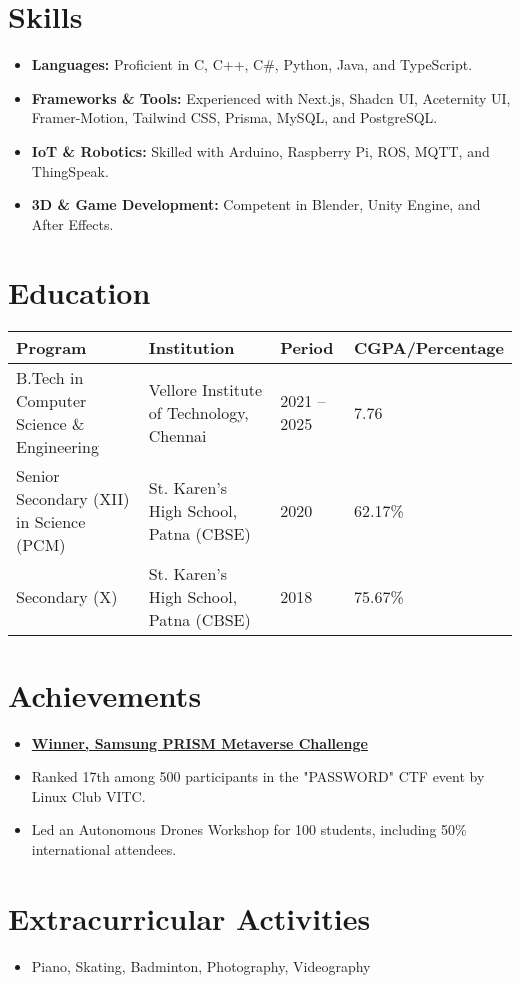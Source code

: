 \documentclass[a4paper,10pt]{article}
\newcommand{\sectionbreak}{\vspace{0.2em}}
\begin{document}
\section{Skills}
\begin{itemize}[noitemsep, topsep=0pt]
    \item \textbf{Languages:} Proficient in C, C++, C\#, Python, Java, and TypeScript.
    \item \textbf{Frameworks \& Tools:} Experienced with Next.js, Shadcn UI, Aceternity UI, Framer-Motion, Tailwind CSS, Prisma, MySQL, and PostgreSQL.
    \item \textbf{IoT \& Robotics:} Skilled with Arduino, Raspberry Pi, ROS, MQTT, and ThingSpeak.
    \item \textbf{3D \& Game Development:} Competent in Blender, Unity Engine, and After Effects.
\end{itemize}

\sectionbreak

\section{Education}
\begin{tabular}{|l|l|l|l|}
\hline
\textbf{Program} & \textbf{Institution} & \textbf{Period} & \textbf{CGPA/Percentage} \\ \hline
B.Tech in Computer Science \& Engineering & Vellore Institute of Technology, Chennai & 2021 – 2025 & 7.76 \\ \hline
Senior Secondary (XII) in Science (PCM) & St. Karen's High School, Patna (CBSE) & 2020 & 62.17\% \\ \hline
Secondary (X) & St. Karen's High School, Patna (CBSE) & 2018 & 75.67\% \\ \hline
\end{tabular}

\sectionbreak

\section{Achievements}
\begin{itemize}[noitemsep, topsep=0pt]
    \item \href{https://drive.google.com/file/d/19xeCrN3ycqXisyDDgIYeygRRVawMKOxu/view?usp=sharing}{\textcolor{accentcolor}{\textbf{Winner, Samsung PRISM Metaverse Challenge}}}
    \item Ranked 17th among 500 participants in the "PASSWORD" CTF event by Linux Club VITC.
    \item Led an Autonomous Drones Workshop for 100 students, including 50\% international attendees.
\end{itemize}

\sectionbreak

\section{Extracurricular Activities}
\begin{itemize}[noitemsep, topsep=0pt]
    \item Piano, Skating, Badminton, Photography, Videography
\end{itemize}
\end{document}
